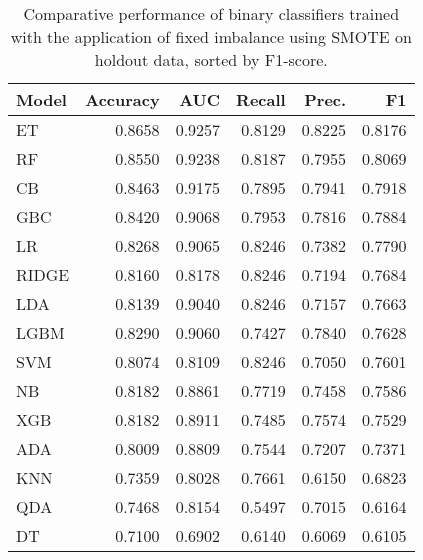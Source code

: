 \begin{table}
\caption{Comparative performance of binary classifiers trained with the application of fixed imbalance using SMOTE on holdout data, sorted by F1-score.}
\label{tbl:binary_True_SMOTE_ho_res_top_models_df}
\begin{tabular}{lrrrrr}
\toprule
Model & Accuracy & AUC & Recall & Prec. & F1 \\
\midrule
ET & 0.8658 & 0.9257 & 0.8129 & 0.8225 & 0.8176 \\
RF & 0.8550 & 0.9238 & 0.8187 & 0.7955 & 0.8069 \\
CB & 0.8463 & 0.9175 & 0.7895 & 0.7941 & 0.7918 \\
GBC & 0.8420 & 0.9068 & 0.7953 & 0.7816 & 0.7884 \\
LR & 0.8268 & 0.9065 & 0.8246 & 0.7382 & 0.7790 \\
RIDGE & 0.8160 & 0.8178 & 0.8246 & 0.7194 & 0.7684 \\
LDA & 0.8139 & 0.9040 & 0.8246 & 0.7157 & 0.7663 \\
LGBM & 0.8290 & 0.9060 & 0.7427 & 0.7840 & 0.7628 \\
SVM & 0.8074 & 0.8109 & 0.8246 & 0.7050 & 0.7601 \\
NB & 0.8182 & 0.8861 & 0.7719 & 0.7458 & 0.7586 \\
XGB & 0.8182 & 0.8911 & 0.7485 & 0.7574 & 0.7529 \\
ADA & 0.8009 & 0.8809 & 0.7544 & 0.7207 & 0.7371 \\
KNN & 0.7359 & 0.8028 & 0.7661 & 0.6150 & 0.6823 \\
QDA & 0.7468 & 0.8154 & 0.5497 & 0.7015 & 0.6164 \\
DT & 0.7100 & 0.6902 & 0.6140 & 0.6069 & 0.6105 \\
\bottomrule
\end{tabular}
\end{table}
